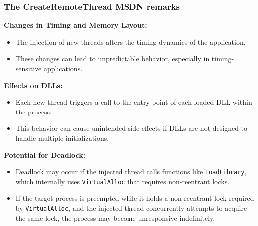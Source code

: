 \begin{frame}
    \frametitle{The CreateRemoteThread MSDN remarks \cite{MicrosoftCreateRemoteThread}}
    \small
    \textbf{Changes in Timing and Memory Layout:}
    \begin{itemize}
        \item The injection of new threads alters the timing dynamics of the application.
        \item These changes can lead to unpredictable behavior, especially in timing-sensitive applications.
    \end{itemize}
    \textbf{Effects on DLLs:}
    \begin{itemize}
        \item Each new thread triggers a call to the entry point of each loaded DLL within the process.
        \item This behavior can cause unintended side effects if DLLs are not designed to handle multiple initializations.
    \end{itemize}
    \textbf{Potential for Deadlock:}
    \begin{itemize}
        \item Deadlock may occur if the injected thread calls functions like \texttt{\color{blue}LoadLibrary},
            which internally uses \texttt{\color{blue}VirtualAlloc} that requires non-reentrant locks.
        \item If the target process is preempted while it holds a non-reentrant lock required by \texttt{\color{blue}VirtualAlloc},
            and the injected thread concurrently attempts to acquire the same lock, the process may become unresponsive indefinitely.
    \end{itemize}
\end{frame}

